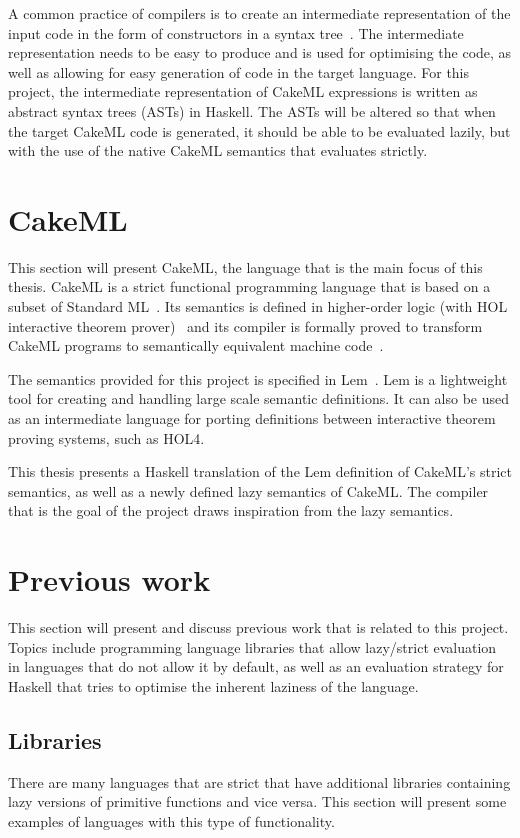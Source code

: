 A common practice of compilers is to create an intermediate representation of
the input code in the form of constructors in a syntax
tree~\cite{DragonBook}. The intermediate representation needs to be
easy to produce and is used for optimising the code, as well as allowing for
easy generation of code in the target language.
For this project, the intermediate representation of CakeML expressions is %
written as abstract syntax trees (ASTs) in Haskell. The ASTs will be altered so
that when the target CakeML code is generated, it should be able to be evaluated
lazily, but with the use of the native CakeML semantics that evaluates strictly.

\section{CakeML}
\label{back:cakeml}
This section will present CakeML, the language that is the main focus of this
thesis. CakeML is a strict functional programming language that is based on a
subset of Standard ML~\cite{CakeML25:online}. Its semantics is defined in
higher-order logic (with HOL interactive theorem prover)~\cite{HOLInter57:online}
and its compiler is formally
proved to transform CakeML programs to semantically equivalent machine
code~\cite{Kumar:2014:CVI:2535838.2535841}.

The semantics provided for this project is specified in
Lem~\cite{Lem33:online,LemPaper}. Lem is a lightweight tool for creating
and handling large scale semantic definitions. It can also be used as an
intermediate language for porting definitions between interactive theorem proving
systems, such as HOL4.

This thesis presents a Haskell translation of the Lem definition of CakeML's
strict semantics, as well as a newly defined lazy semantics of CakeML. The
compiler that is the goal of the project draws inspiration from the lazy
semantics.

\section{Previous work}
This section will present and discuss previous work that is related to this
project. Topics include programming language libraries that allow lazy/strict
evaluation in languages that do not allow it by default, as well as an
evaluation strategy for Haskell that tries to optimise the inherent laziness
of the language.

\subsection{Libraries}
There are many languages that are strict that have additional libraries
containing lazy versions of primitive functions and vice versa. This section
will present some examples of languages with this type of functionality.

